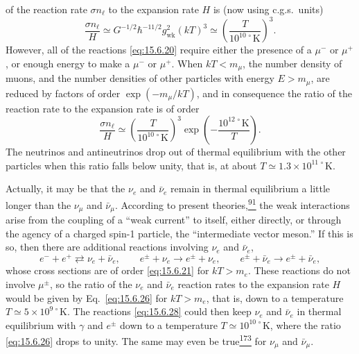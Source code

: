 of the reaction rate \(\sigma n_\ell\) to the expansion rate \(H\) is (now
using c.g.s.\ units)
\begin{equation}
  \frac{\sigma n_\ell}{H}
  \simeq
  G^{-1/2}\hbar^{-11/2}g_{\mathrm{wk}}^2(kT)^3
  \simeq
  \left(\frac{T}{10^{10\,\circ}\mathrm K}\right)^3.
  \tag{15.6.26}\label{eq:15.6.26}
\end{equation}
However, all of the reactions \eqref{eq:15.6.20} require either the presence
of a \(\mu^-\) or \(\mu^+\), or enough energy to make a \(\mu^-\) or
\(\mu^+\). When \(kT<m_\mu\), the number density of muons, and the number
densities of other particles with energy \(E>m_\mu\), are reduced by factors
of order \(\exp(-m_\mu/kT)\), and in consequence the ratio of the reaction
rate to the expansion rate is of order
\begin{equation}
  \frac{\sigma n_\ell}{H}
  \simeq
  \left(\frac{T}{10^{10\,\circ}\mathrm K}\right)^3
  \exp\left(-\frac{10^{12\,\circ}\mathrm K}{T}\right).
  \tag{15.6.27}\label{eq:15.6.27}
\end{equation}
The neutrinos and antineutrinos drop out of thermal equilibrium with the other
particles when this ratio falls below unity, that is, at about
\(T\simeq1.3\times10^{11\,\circ}\mathrm K\).

Actually, it may be that the \(\nu_e\) and \(\bar\nu_e\) remain in thermal
equilibrium a little longer than the \(\nu_\mu\) and \(\bar\nu_\mu\).
According to present theories,\hyperref[ch15-ref-91]{\textsuperscript{91}} the
weak interactions arise from the coupling of a ``weak current'' to itself,
either directly, or through the agency of a charged spin-1 particle, the
``intermediate vector meson.'' If this is so, then there are additional
reactions involving \(\nu_e\) and \(\bar\nu_e\),
\begin{equation}
  e^-+e^+\rightleftarrows\nu_e+\bar\nu_e,
  \qquad
  e^\pm+\nu_e\to e^\pm+\nu_e,
  \qquad
  e^\pm+\bar\nu_e\to e^\pm+\bar\nu_e,
  \tag{15.6.28}\label{eq:15.6.28}
\end{equation}
whose cross sections are of order \eqref{eq:15.6.21} for \(kT>m_e\). These
reactions do not involve \(\mu^\pm\), so the ratio of the \(\nu_e\) and
\(\bar\nu_e\) reaction rates to the expansion rate \(H\) would be given by
Eq.~\eqref{eq:15.6.26} for \(kT>m_e\), that is, down to a temperature
\(T\simeq5\times10^{9\,\circ}\mathrm K\). The reactions \eqref{eq:15.6.28}
could then keep \(\nu_e\) and \(\bar\nu_e\) in thermal equilibrium with
\(\gamma\) and \(e^\pm\) down to a temperature
\(T\simeq10^{10\,\circ}\mathrm K\), where the ratio \eqref{eq:15.6.26} drops
to unity. The same may even be
true\hyperref[ch15-ref-173]{\textsuperscript{173}} for \(\nu_\mu\) and
\(\bar\nu_\mu\).

